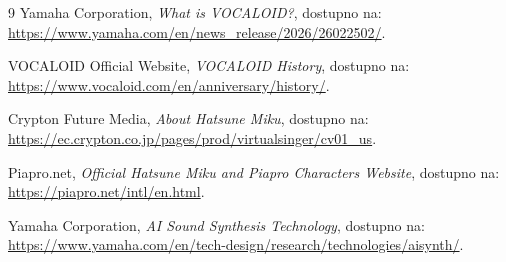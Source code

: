 \documentclass[12pt,a4paper]{article}
\begin{document}
\begin{thebibliography}{9}
Yamaha Corporation, \textit{What is VOCALOID?}, dostupno na:
\url{https://www.yamaha.com/en/news_release/2026/26022502/}.

VOCALOID Official Website, \textit{VOCALOID History}, dostupno na:
\url{https://www.vocaloid.com/en/anniversary/history/}.

Crypton Future Media, \textit{About Hatsune Miku}, dostupno na:
\url{https://ec.crypton.co.jp/pages/prod/virtualsinger/cv01_us}.

Piapro.net, \textit{Official Hatsune Miku and Piapro Characters Website}, dostupno na:
\url{https://piapro.net/intl/en.html}.

Yamaha Corporation, \textit{AI Sound Synthesis Technology}, dostupno na:
\url{https://www.yamaha.com/en/tech-design/research/technologies/aisynth/}.
\end{thebibliography}
\end{document}
